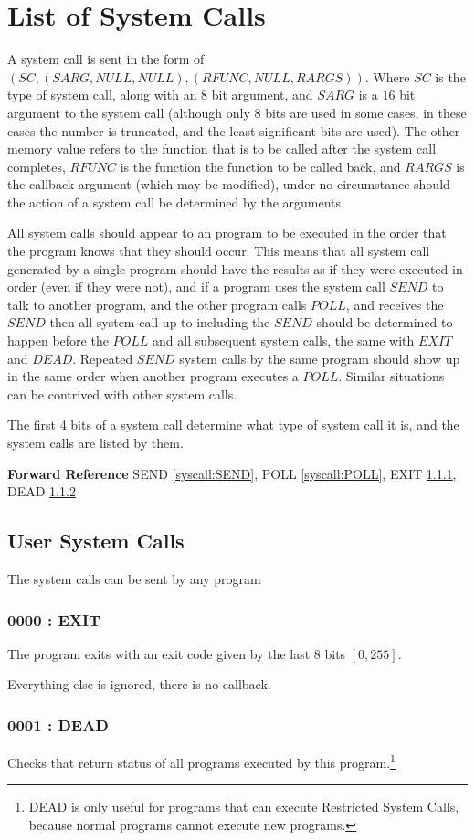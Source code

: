 \documentclass[12pt,letterpaper]{report}
\newcommand{\mem}[3]{\left(#1, #2, #3\right)}
\newcommand{\nil}{NULL}
\newcommand{\SEE}{\textbf{Forward Reference} }
\newcommand{\fref}[2]{#2 \ref{#1:#2}}
\begin{document}
\section{List of System Calls}
A system call is sent in the form of $\mem{SC}{\mem{SARG}{\nil}{\nil}}{\mem{RFUNC}{\nil}{RARGS}}$. Where $SC$ is the type of system call, along with an $8$ bit argument, and $SARG$ is a $16$ bit argument to the system call (although only $8$ bits are used in some cases, in these cases the number is truncated, and the least significant bits are used). The other memory value refers to the function that is to be called after the system call completes, $RFUNC$ is the function the function to be called back, and $RARGS$ is the callback argument (which may be modified), under no circumstance should the action of a system call be determined by the arguments.

All system calls should appear to an program to be executed in the order that the program knows that they should occur. This means that all system call generated by a single program should have the results as if they were executed in order (even if they were not), and if a program uses the system call $SEND$ to talk to another program, and the other program calls $POLL$, and receives the $SEND$ then all system call up to including the $SEND$ should be determined to happen before the $POLL$ and all subsequent system calls, the same with $EXIT$ and $DEAD$. Repeated $SEND$ system calls by the same program should show up in the same order when another program executes a $POLL$. Similar situations can be contrived with other system calls.

The first 4 bits of a system call determine what type of system call it is, and the system calls are listed by them.

\SEE \fref{syscall}{SEND}, \fref{syscall}{POLL}, \fref{syscall}{EXIT}, \fref{syscall}{DEAD}
\subsection{User System Calls}
The system calls can be sent by any program
\subsubsection{0000 : EXIT}
\label{syscall:EXIT}
The program exits with an exit code given by the last 8 bits $\left[0, 255\right]$.

Everything else is ignored, there is no callback.
\subsubsection{0001 : DEAD}
\label{syscall:DEAD}
Checks that return status of all programs executed by this program.\footnote{DEAD is only useful for programs that can execute Restricted System Calls, because normal programs cannot execute new programs.}
\end{document}
